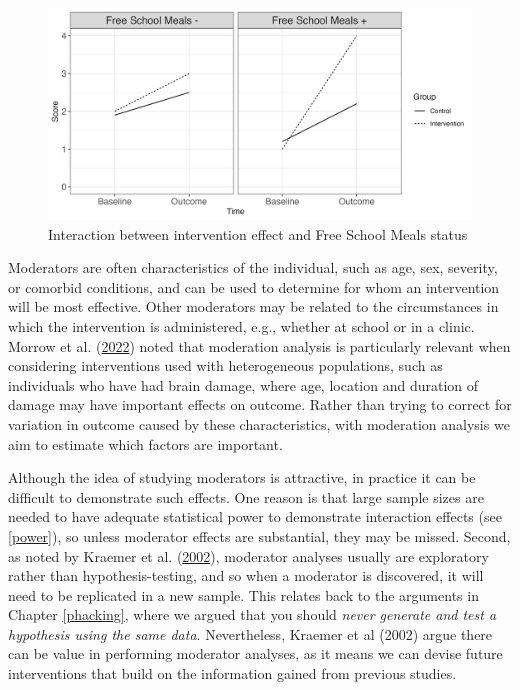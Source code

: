 \documentclass{krantz}
\begin{document}
\begin{center}
\begin{figure}
\includegraphics[width=0.95\linewidth]{images_bw/Moderator} \caption{Interaction between intervention effect and Free School Meals status}\label{fig:modfig}
\end{figure}
\end{center}

Moderators are often characteristics of the individual, such as age, sex, severity, or comorbid conditions, and can be used to determine for whom an intervention will be most effective. Other moderators may be related to the circumstances in which the intervention is administered, e.g., whether at school or in a clinic. Morrow et al. (\protect\hyperlink{ref-morrow2022}{2022}) noted that moderation analysis is particularly relevant when considering interventions used with heterogeneous populations, such as individuals who have had brain damage, where age, location and duration of damage may have important effects on outcome. Rather than trying to correct for variation in outcome caused by these characteristics, with moderation analysis we aim to estimate which factors are important.

Although the idea of studying moderators is attractive, in practice it can be difficult to demonstrate such effects. One reason is that large sample sizes are needed to have adequate statistical power to demonstrate interaction effects (see \ref{power}), so unless moderator effects are substantial, they may be missed. Second, as noted by Kraemer et al. (\protect\hyperlink{ref-kraemer2002}{2002}), moderator analyses usually are exploratory rather than hypothesis-testing, and so when a moderator is discovered, it will need to be replicated in a new sample. This relates back to the arguments in Chapter \ref{phacking}, where we argued that you should \emph{never generate and test a hypothesis using the same data}. Nevertheless, Kraemer et al (2002) argue there can be value in performing moderator analyses, as it means we can devise future interventions that build on the information gained from previous studies.
\end{document}

